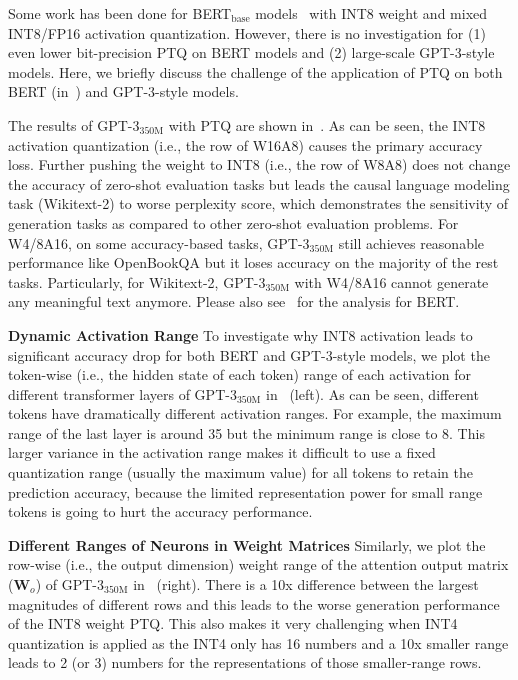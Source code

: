 Some work has been done for BERT$_\text{base}$ models~\cite{bondarenko2021understanding} with INT8 weight and mixed INT8/FP16 activation quantization. However, there is no investigation for (1) even lower bit-precision PTQ on BERT models and (2) large-scale GPT-3-style models. Here, we briefly discuss the challenge of the application of PTQ on both BERT (in~) and GPT-3-style models.

The results of GPT-3$_{\text{350M}}$ with PTQ are shown in~.
As can be seen, the INT8 activation quantization (i.e., the row of W16A8) causes the primary accuracy loss. Further pushing the weight to INT8 (i.e., the row of W8A8) does not change the accuracy of zero-shot evaluation tasks but leads the causal language modeling task (Wikitext-2) to worse perplexity score, which demonstrates the sensitivity of generation tasks as compared to other zero-shot evaluation problems. For W4/8A16, on some accuracy-based tasks, GPT-3$_{\text{350M}}$ still achieves reasonable performance like OpenBookQA but it loses accuracy on the majority of the rest tasks. Particularly, for Wikitext-2, GPT-3$_{\text{350M}}$ with W4/8A16 cannot generate any meaningful text anymore. Please also see~ for the analysis for BERT.

\textbf{Dynamic Activation Range} To investigate why INT8 activation leads to significant accuracy drop for both BERT and GPT-3-style models, we plot the token-wise (i.e., the hidden state of each token) range of each activation for different transformer layers of GPT-3$_{\text{350M}}$ in~ (left). As can be seen, different tokens have dramatically different activation ranges. For example, the maximum range of the last layer is around 35 but the minimum range is close to 8. This larger variance in the activation range makes it difficult to use a fixed quantization range (usually the maximum value) for all tokens to retain the prediction accuracy, because the limited representation power for small range tokens is going to hurt the accuracy performance. 

\textbf{Different Ranges of Neurons in Weight Matrices} Similarly, we plot the row-wise (i.e., the output dimension) weight range of the attention output matrix (${\bm{W}}_{o}$) of GPT-3$_{\text{350M}}$ in~ (right). There is a 10x difference between the largest magnitudes of different rows and this leads to the worse generation performance of the INT8 weight PTQ. This also makes it very challenging when INT4 quantization is applied as the INT4 only has 16 numbers and a 10x smaller range leads to 2 (or 3) numbers for the representations of those smaller-range rows. 

